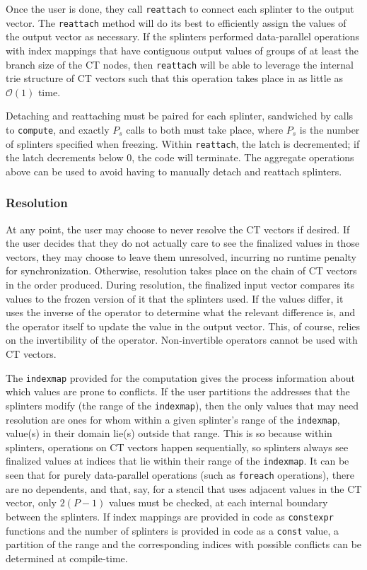 \documentclass[pageno]{jpaper}
\begin{document}
Once the user is done, they call \texttt{reattach} to connect each splinter to the output 
vector. The \texttt{reattach} method will do its best to efficiently assign the values 
of the output vector as necessary. If the splinters performed data-parallel operations 
with index mappings that have contiguous output values of groups of at least the branch size 
of the CT nodes, then \texttt{reattach} will be able to leverage the internal trie 
structure of CT vectors such that this operation takes place in as little as $\mathcal{O}(1)$
time.

Detaching and reattaching must be paired for each splinter, sandwiched by calls to
\texttt{compute}, and exactly $P_s$ calls to both must take 
place, where $P_s$ is the number of splinters specified when freezing. Within 
\texttt{reattach}, the latch is decremented; if the latch decrements below 0, the code 
will terminate. The aggregate operations above can be used to avoid having to
manually detach and reattach splinters.

\subsubsection{Resolution}
At any point, the user may choose to never resolve the CT vectors if desired. If the 
user decides that they do not actually care to see the finalized values in those 
vectors, they may choose to leave them unresolved, incurring no runtime penalty for 
synchronization. Otherwise, resolution takes place on the chain of CT vectors in
the order produced.
During resolution, the finalized input vector compares its values to the frozen
version of it that the splinters used. If the values differ, it uses the inverse
of the operator to determine what the relevant difference is, and the operator
itself to update the value in the output vector. This, of course, relies on the
invertibility of the operator. Non-invertible operators cannot be used with CT
vectors.

The \texttt{indexmap} provided for the computation gives the process information
about which values are prone to conflicts. If the user partitions the addresses
that the splinters modify (the range of the \texttt{indexmap}), then the only
values that may need resolution are ones for whom within a given splinter's
range of the \texttt{indexmap}, value(s) in their domain lie(s) outside that
range. This is so because within splinters, operations on CT vectors happen
sequentially, so splinters always see finalized values at indices that lie
within their range of the \texttt{indexmap}. It can be seen that for purely
data-parallel operations (such as \texttt{foreach} operations), there are no
dependents, and that, say, for a stencil that uses adjacent values in the CT
vector, only $2(P-1)$ values must be checked, at each internal boundary between
the splinters. If index mappings are provided in code as \texttt{constexpr}
functions and the number of splinters is provided in code as a \texttt{const}
value, a partition of the range and the corresponding indices with possible
conflicts can be determined at compile-time.
\end{document}
